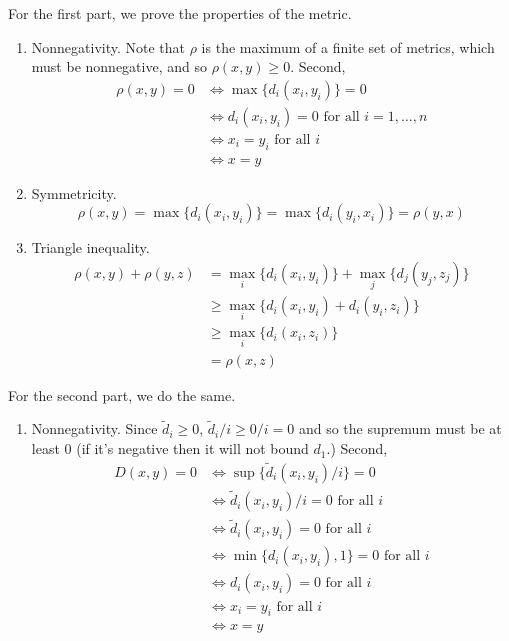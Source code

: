 \begin{solution}
  For the first part, we prove the properties of the metric. 
  \begin{enumerate}
    \item Nonnegativity. Note that $\rho$ is the maximum of a finite set of metrics, which must be nonnegative, and so $\rho(x, y) \geq 0$. Second,  
    \begin{align}
      \rho(x, y) = 0 & \iff \max\{d_i (x_i, y_i)\} = 0 \\
                     & \iff d_i (x_i, y_i) = 0 \text{ for all } i = 1, \ldots, n  \\
                     & \iff x_i = y_i \text{ for all } i \\
                     & \iff x = y
    \end{align}

    \item Symmetricity. 
    \begin{equation}
      \rho(x, y) = \max\{d_i (x_i, y_i)\} = \max\{d_i (y_i, x_i)\} = \rho(y, x)
    \end{equation}

    \item Triangle inequality. 
    \begin{align}
      \rho(x, y) + \rho(y, z) & = \max_i \{d_i (x_i, y_i)\} + \max_j \{d_j (y_j, z_j)\} \\
                              & \geq \max_i \{ d_i (x_i, y_i) + d_i (y_i, z_i) \} \\
                              & \geq \max_i \{ d_i (x_i, z_i) \} \\
                              & = \rho(x, z)
    \end{align}
  \end{enumerate} 
  
  For the second part, we do the same. 
  \begin{enumerate}
    \item Nonnegativity. Since $\tilde{d}_i \geq 0$, $\tilde{d}_i / i \geq 0/i = 0$ and so the supremum must be at least $0$ (if it's negative then it will not bound $d_1$.) Second, 
      \begin{align}
        D(x, y) = 0 & \iff \sup\{\tilde{d}_i (x_i, y_i) / i \} = 0 \\
                    & \iff \tilde{d}_i (x_i, y_i) / i = 0 \text{ for all } i \\
                    & \iff \tilde{d}_i (x_i, y_i) = 0 \text{ for all } i \\
                    & \iff \min\{d_i (x_i, y_i), 1 \} = 0 \text{ for all } i \\ 
                    & \iff d_i (x_i, y_i) = 0 \text{ for all } i \\
                    & \iff x_i = y_i \text{ for all } i \\
                    & \iff x = y
      \end{align}


\end{enumerate}
\end{solution}
